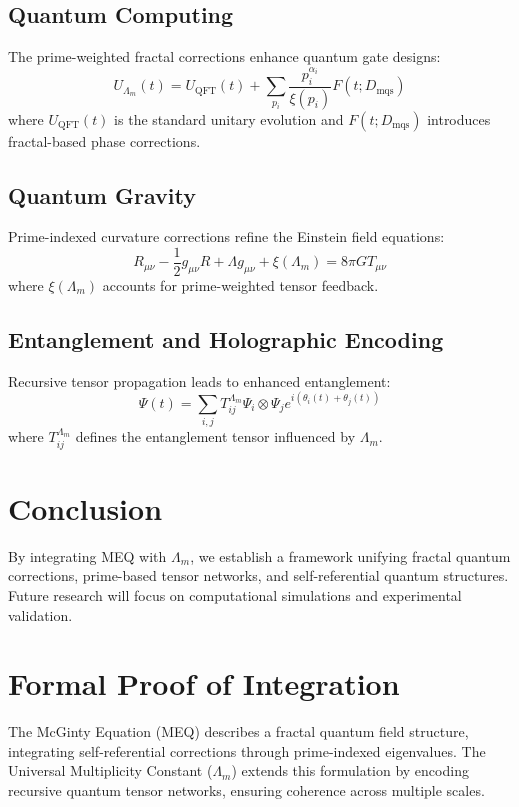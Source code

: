 \documentclass{article}
\theoremstyle{plain}
\begin{document}
\subsection{Quantum Computing}
The prime-weighted fractal corrections enhance quantum gate designs:
\begin{equation}
    U_{\Lambda_m}(t) = U_{\text{QFT}}(t) + \sum_{p_i} \frac{p_i^{\alpha_i}}{\xi(p_i)} F(t; D_{\text{mqs}})
\end{equation}
where $U_{\text{QFT}}(t)$ is the standard unitary evolution and $F(t; D_{\text{mqs}})$ introduces fractal-based phase corrections.

\subsection{Quantum Gravity}
Prime-indexed curvature corrections refine the Einstein field equations:
\begin{equation}
    R_{\mu\nu} - \frac{1}{2} g_{\mu\nu} R + \Lambda g_{\mu\nu} + \xi(\Lambda_m) = 8\pi G T_{\mu\nu}
\end{equation}
where $\xi(\Lambda_m)$ accounts for prime-weighted tensor feedback.

\subsection{Entanglement and Holographic Encoding}
Recursive tensor propagation leads to enhanced entanglement:
\begin{equation}
    \Psi(t) = \sum_{i,j} T_{ij}^{\Lambda_m} \Psi_i \otimes \Psi_j e^{i(\theta_i(t) + \theta_j(t))}
\end{equation}
where $T_{ij}^{\Lambda_m}$ defines the entanglement tensor influenced by $\Lambda_m$.

\section{Conclusion}
By integrating MEQ with $\Lambda_m$, we establish a framework unifying fractal quantum corrections, prime-based tensor networks, and self-referential quantum structures. Future research will focus on computational simulations and experimental validation.

\section{Formal Proof of Integration}
The McGinty Equation (MEQ) describes a fractal quantum field structure, integrating self-referential corrections through prime-indexed eigenvalues. The Universal Multiplicity Constant ($\Lambda_m$) extends this formulation by encoding recursive quantum tensor networks, ensuring coherence across multiple scales.
\
\end{document}
